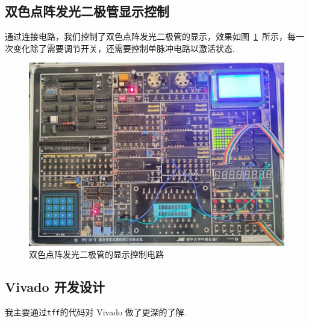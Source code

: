 \documentclass[fontset=windows,11pt]{SEU-Digital-Report}
\begin{document}
        \subsection{双色点阵发光二极管显示控制}

            通过连接电路，我们控制了双色点阵发光二极管的显示，效果如图~\ref{fig:LEDs}~所示，每一次变化除了需要调节开关，还需要控制单脉冲电路以激活状态.

            \begin{figure}[htbp]
                \centering
                \includegraphics[width=.6\linewidth]{fig/LEDs.jpg}
                \caption{双色点阵发光二极管的显示控制电路}
                \label{fig:LEDs}
            \end{figure}

        \subsection{Vivado 开发设计}\label{subsec:vivado_improvement}

            我主要通过\texttt{tff}\cite{github:fpga-verilog}的代码对 Vivado 做了更深的了解.
\end{document}

